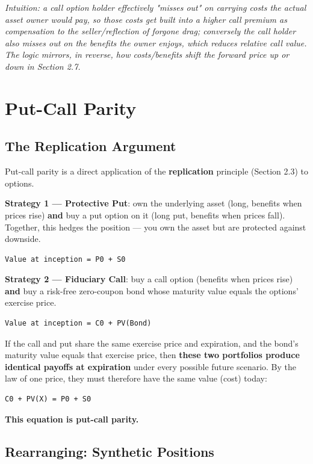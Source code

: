 \documentclass[12pt,openany]{book}
\theoremstyle{definition}
\theoremstyle{remark}
\begin{document}
\emph{Intuition: a call option holder effectively "misses out" on carrying costs the actual asset owner would pay, so those costs get built into a higher call premium as compensation to the seller/reflection of forgone drag; conversely the call holder also misses out on the benefits the owner enjoys, which reduces relative call value. The logic mirrors, in reverse, how costs/benefits shift the forward price up or down in Section 2.7.}


\section{Put-Call Parity}

\subsection{The Replication Argument}

Put-call parity is a direct application of the \textbf{replication} principle (Section 2.3) to options.

\textbf{Strategy 1 — Protective Put}: own the underlying asset (long, benefits when prices rise) \textbf{and} buy a put option on it (long put, benefits when prices fall). Together, this hedges the position — you own the asset but are protected against downside.
\begin{lstlisting}[style=notesCode]
Value at inception = P0 + S0
\end{lstlisting}

\textbf{Strategy 2 — Fiduciary Call}: buy a call option (benefits when prices rise) \textbf{and} buy a risk-free zero-coupon bond whose maturity value equals the options' exercise price.
\begin{lstlisting}[style=notesCode]
Value at inception = C0 + PV(Bond)
\end{lstlisting}

If the call and put share the same exercise price and expiration, and the bond's maturity value equals that exercise price, then \textbf{these two portfolios produce identical payoffs at expiration} under every possible future scenario. By the law of one price, they must therefore have the same value (cost) today:

\begin{lstlisting}[style=notesCode]
C0 + PV(X) = P0 + S0
\end{lstlisting}

\textbf{This equation is put-call parity.}

\subsection{Rearranging: Synthetic Positions}
\end{document}
